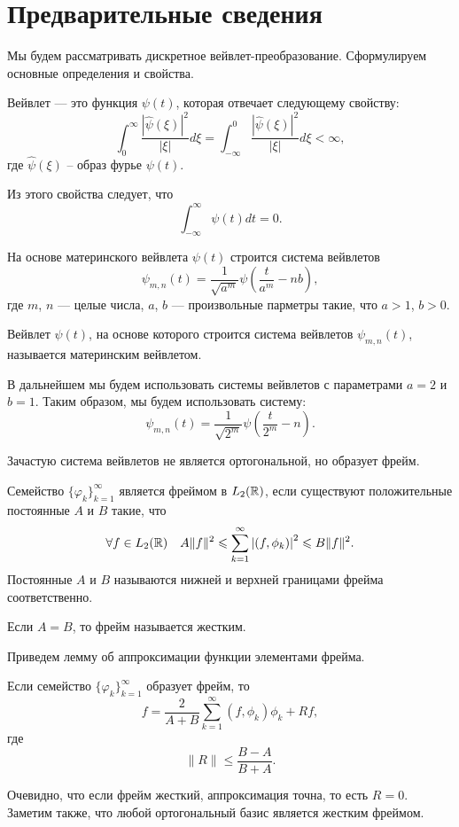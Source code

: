 \documentclass[../paper.tex]{subfiles}
\begin{document}
\section{Предварительные сведения}
Мы будем рассматривать дискретное вейвлет-преобразование. Сформулируем основные определения и свойства.
\begin{Def}
	Вейвлет --- это функция $\psi(t)$, которая отвечает следующему свойству:
	\[
		\int_0^\infty \frac{ \left|\hat{\psi}(\xi)\right|^2 }{\left|\xi\right|} d \xi
		= \int_{-\infty}^0 \frac{ \left|\hat{\psi}(\xi)\right|^2 }{\left|\xi\right|} d \xi
		< \infty
	,\] где $\hat{\psi}(\xi)$ -- образ фурье $\psi(t)$.
\end{Def}

Из этого свойства следует, что
\[
	\int_{-\infty}^{\infty} \psi(t) dt = 0
.\]

На основе материнского вейвлета $\psi(t)$ строится система вейвлетов
\[
	\psi_{m,n}(t) = \frac{1}{\sqrt{a^m}} \psi\left(\frac{t}{a^m} - n b\right)
,\]
где $m$, $n$ --- целые числа, $a$, $b$ --- произвольные парметры такие, что $a > 1$, $b > 0$.

Вейвлет $\psi(t)$, на основе которого строится система вейвлетов $\psi_{m,n}(t)$, называется материнским вейвлетом.

В дальнейшем мы будем использовать системы вейвлетов с параметрами $a=2$ и $b=1$.
Таким образом, мы будем использовать систему:
\[
	\psi_{m,n}(t) = \frac{1}{\sqrt{2^m}} \psi\left(\frac{t}{2^m} - n\right)
.\]

Зачастую система вейвлетов не является ортогональной, но образует фрейм.
\begin{Def}
	Семейство $\{\varphi_k\}_{k=1}^\infty$ является фреймом в $L_2(\mathbb{R})$, если существуют положительные постоянные $A$ и $B$ такие, что
	\[
		\forall f \in L_2(\mathbb{R}) \quad A \|f\|^2 \leqslant \sum_{k=1}^\infty \left|\left(f, \phi_k\right)\right|^2 \leqslant B \|f\|^2
	.\]
	Постоянные $A$ и $B$ называются нижней и верхней границами фрейма соответственно.

	Если $A = B$, то фрейм называется жестким.
\end{Def}

Приведем лемму об аппроксимации функции элементами фрейма.
\begin{Lem*}
	Если семейство $\{\varphi_k\}_{k=1}^\infty$ образует фрейм, то
	\[
		f = \frac{2}{A+B} \sum_{k=1}^\infty \left(f, \phi_k\right)\phi_k + Rf
	,\] где \[
		\|R\| \leqslant \frac{B-A}{B+A}
	.\]
\end{Lem*}
Очевидно, что если фрейм жесткий, аппроксимация точна, то есть $R = 0$.
Заметим также, что любой ортогональный базис является жестким фреймом.
\end{document}
